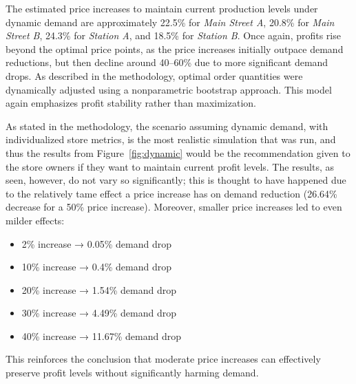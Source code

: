 The estimated price increases to maintain current production levels under dynamic demand are approximately 22.5\% for \textit{Main Street A}, 20.8\% for \textit{Main Street B}, 24.3\% for \textit{Station A}, and 18.5\% for \textit{Station B}. Once again, profits rise beyond the optimal price points, as the price increases initially outpace demand reductions, but then decline around 40--60\% due to more significant demand drops. As described in the methodology, optimal order quantities were dynamically adjusted using a nonparametric bootstrap approach. This model again emphasizes profit stability rather than maximization.

As stated in the methodology, the scenario assuming dynamic demand, with individualized store metrics, is the most realistic simulation that was run, and thus the results from Figure~\ref{fig:dynamic} would be the recommendation given to the store owners if they want to maintain current profit levels. The results, as seen, however, do not vary so significantly; this is thought to have happened due to the relatively tame effect a price increase has on demand reduction (26.64\% decrease for a 50\% price increase). Moreover, smaller price increases led to even milder effects:
\begin{itemize}
    \item 2\% increase → 0.05\% demand drop
    \item 10\% increase → 0.4\% demand drop
    \item 20\% increase → 1.54\% demand drop
    \item 30\% increase → 4.49\% demand drop
    \item 40\% increase → 11.67\% demand drop
\end{itemize}

This reinforces the conclusion that moderate price increases can effectively preserve profit levels without significantly harming demand.
